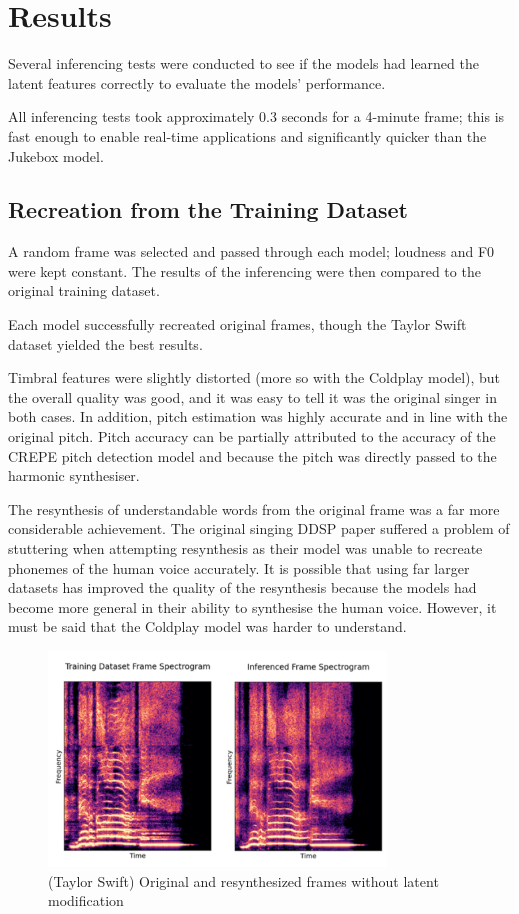 \section{Results}

Several inferencing tests were conducted to see if the models had learned the latent features correctly to evaluate the models' performance.

All inferencing tests took approximately 0.3 seconds for a 4-minute frame; this is fast enough to enable real-time applications and significantly quicker than the Jukebox model.

\subsection{Recreation from the Training Dataset}

A random frame was selected and passed through each model; loudness and F0 were kept constant. The results of the inferencing were then compared to the original training dataset.

Each model successfully recreated original frames, though the Taylor Swift dataset yielded the best results.

Timbral features were slightly distorted (more so with the Coldplay model), but the overall quality was good, and it was easy to tell it was the original singer in both cases. In addition, pitch estimation was highly accurate and in line with the original pitch. Pitch accuracy can be partially attributed to the accuracy of the CREPE pitch detection model\cite{CREPE} and because the pitch was directly passed to the harmonic synthesiser.

The resynthesis of understandable words from the original frame was a far more considerable achievement. The original singing DDSP paper\cite{SingingDDSP} suffered a problem of stuttering when attempting resynthesis as their model was unable to recreate phonemes of the human voice accurately. It is possible that using far larger datasets has improved the quality of the resynthesis because the models had become more general in their ability to synthesise the human voice. However, it must be said that the Coldplay model was harder to understand.

\begin{figure}[H]
    \centering
    \includegraphics[width=0.8\textwidth]{research/results/TaylorSwift/InferredRecreation.png}
    \caption{(Taylor Swift) Original and resynthesized frames without latent modification}
\end{figure}

